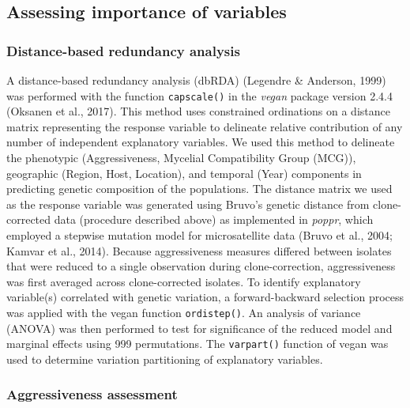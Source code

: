 \subsection*{Assessing importance of
variables}\label{assessing-importance-of-variables}

\subsubsection*{Distance-based redundancy
analysis}\label{distance-based-redundancy-analysis}

A distance-based redundancy analysis (dbRDA) (Legendre \& Anderson,
1999) was performed with the function \texttt{capscale()} in the
\emph{vegan} package version 2.4.4 (Oksanen et al., 2017). This method
uses constrained ordinations on a distance matrix representing the
response variable to delineate relative contribution of any number of
independent explanatory variables. We used this method to delineate the
phenotypic (Aggressiveness, Mycelial Compatibility Group (MCG)),
geographic (Region, Host, Location), and temporal (Year) components in
predicting genetic composition of the populations. The distance matrix
we used as the response variable was generated using Bruvo's genetic
distance from clone-corrected data (procedure described above) as
implemented in \emph{poppr}, which employed a stepwise mutation model
for microsatellite data (Bruvo et al., 2004; Kamvar et al., 2014).
Because aggressiveness measures differed between isolates that were
reduced to a single observation during clone-correction, aggressiveness
was first averaged across clone-corrected isolates. To identify
explanatory variable(s) correlated with genetic variation, a
forward-backward selection process was applied with the vegan function
\texttt{ordistep()}. An analysis of variance (ANOVA) was then performed
to test for significance of the reduced model and marginal effects using
999 permutations. The \texttt{varpart()} function of vegan was used to
determine variation partitioning of explanatory variables.

\subsubsection*{Aggressiveness
assessment}\label{aggressiveness-assessment}

